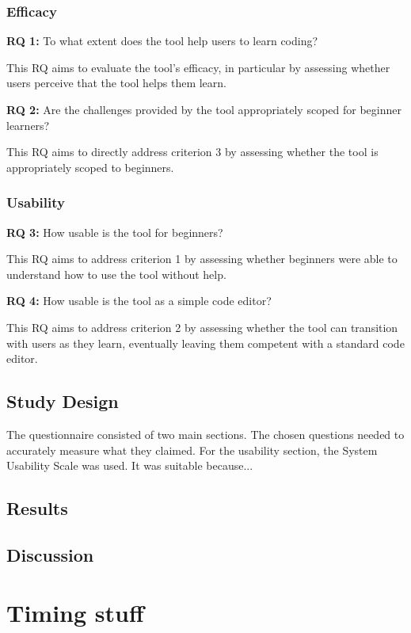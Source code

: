 \subsubsection{Efficacy}
\textbf{RQ 1: }To what extent does the tool help users to learn coding? 

This RQ aims to evaluate the tool's efficacy, in particular by assessing whether users perceive that the tool helps them learn.

\textbf{RQ 2: }Are the challenges provided by the tool appropriately scoped for beginner learners?

This RQ aims to directly address criterion 3 by assessing whether the tool is appropriately scoped to beginners.

\subsubsection{Usability}
\textbf{RQ 3: }How usable is the tool for beginners?

This RQ aims to address criterion 1 by assessing whether beginners were able to understand how to use the tool without help.

\textbf{RQ 4: }How usable is the tool as a simple code editor?

This RQ aims to address criterion 2 by assessing whether the tool can transition with users as they learn, eventually leaving them competent with a standard code editor.

\subsection{Study Design}

The questionnaire consisted of two main sections. The chosen questions needed to accurately measure what they claimed. For the usability section, the System Usability Scale \cite{brooke_sus_1995} was used. It was suitable because...

\subsection{Results}


\subsection{Discussion}

\section{Timing stuff}